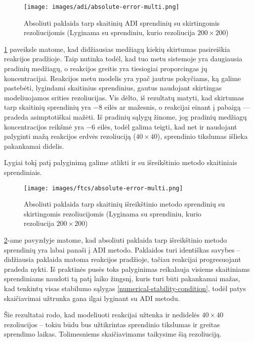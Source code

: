 \newpage

\begin{figure}[h!]
  \centering
  \texttt{[image: images/adi/absolute-error-multi.png]}
  \caption{Absoliuti paklaida tarp skaitinių ADI sprendinių su skirtingomis rezoliucijomis (Lyginama su sprendiniu, kurio rezoliucija $200\times200$)}
  \label{fig:adi-numerical-solution-absolute-error}
\end{figure}
\ref{fig:adi-numerical-solution-absolute-error} paveiksle matome, kad didžiausias medžiagų kiekių skirtumas pasireiškia reakcijos pradžioje. Taip nutinka todėl, kad tuo metu sistemoje yra daugiausia pradinių medžiagų, o reakcijos greitis yra tiesiogiai proporcingas jų koncentracijai. Reakcijos metu modelis yra ypač jautrus pokyčiams, ką galime pastebėti, lygindami skaitinius sprendinius, gautus naudojant skirtingas modeliuojamos srities rezoliucijas. Vis dėlto, iš rezultatų matyti, kad skirtumas tarp skaitinių sprendinių yra $-8$ eilės ar mažesnis, o reakcijai einant į pabaigą — pradeda asimptotiškai mažėti. Iš pradinių sąlygų žinome, jog pradinių medžiagų koncentracijos reikšmė yra $-6$ eilės, todėl galima teigti, kad net ir naudojant palyginti mažą reakcijos erdvės rezoliuciją ($40\times40$), sprendinio tikslumas išlieka pakankamai didelis. 

Lygiai tokį patį palyginimą galime atlikti ir su išreikštinio metodo skaitiniais sprendiniais.

\begin{figure}[htb!]
  \centering
  \texttt{[image: images/ftcs/absolute-error-multi.png]}
  \caption{Absoliuti paklaida tarp skaitinių išreikštinio metodo sprendinių su skirtingomis rezoliucijomis (Lyginama su sprendiniu, kurio rezoliucija $200\times200$)}
  \label{fig:ftcs-numerical-solution-absolute-error}
\end{figure}

\ref{fig:ftcs-numerical-solution-absolute-error}-ame pavyzdyje matome, kad absoliuti paklaida tarp išreikštinio metodo sprendinių yra labai panaši į ADI metodo. Paklaidos turi identiškas savybes -- didžiausia paklaida matoma reakcijos pradžioje, tačiau reakcijai progresuojant pradeda nykti. Iš praktinės pusės toks palyginimas reikalauja visiems skaitiniams sprendiniams naudoti tą patį laiko žingsnį, kuris turi būti pakankamai mažas, kad tenkintų visas stabilumo sąlygas \eqref{numerical-stability-condition}, todėl patys skaičiavimai užtrunka gana ilgai lyginant su ADI metodu.

Šie rezultatai rodo, kad modeliuoti reakcijai užtenka ir nedidelės $40\times 40$ rezoliucijos -- tokiu būdu bus užtikrintas sprendinio tikslumas ir greitas sprendimo laikas. Tolimesniems skaičiavimams taikysime šią rezoliuciją.